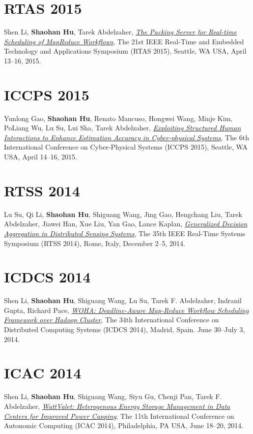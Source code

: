 \section{\sc RTAS 2015}\hypertarget{li2015rtas}{} Shen Li, \textbf{Shaohan Hu}, Tarek Abdelzaher, \href{http://ieeexplore.ieee.org/xpl/articleDetails.jsp?tp=&arnumber=7108416}{\emph{The Packing Server for Real-time Scheduling of MapReduce Workflows}}, \textsf{The 21st IEEE Real-Time and Embedded Technology and Applications Symposium (RTAS 2015)}, Seattle, WA USA, April 13--16, 2015.

\section{\sc ICCPS 2015}\hypertarget{gao2015iccps}{} Yunlong Gao, \textbf{Shaohan Hu}, Renato Mancuso, Hongwei Wang, Minje Kim, PoLiang Wu, Lu Su, Lui Sha, Tarek Abdelzaher, \href{http://dl.acm.org/citation.cfm?id=2735960.2735965}{\emph{Exploiting Structured Human Interactions to Enhance Estimation Accuracy in Cyber-physical Systems}}, \textsf{The 6th International Conference on Cyber-Physical Systems (ICCPS 2015)}, Seattle, WA USA, April 14--16, 2015.

\section{\sc RTSS 2014}\hypertarget{su2014rtss}{} Lu Su, Qi Li, \textbf{Shaohan Hu}, Shiguang Wang, Jing Gao, Hengchang Liu, Tarek Abdelzaher, Jiawei Han, Xue Liu, Yan Gao, Lance Kaplan, \href{http://ieeexplore.ieee.org/xpl/articleDetails.jsp?arnumber=7010369}{\emph{Generalized Decision Aggregation in Distributed Sensing Systems}}, \textsf{The 35th IEEE Real-Time Systems Symposium (RTSS 2014)}, Rome, Italy, December 2--5, 2014.

\section{\sc ICDCS 2014}\hypertarget{li2014icdcs}{} Shen Li, \textbf{Shaohan Hu}, Shiguang Wang, Lu Su, Tarek F. Abdelzaher, Indranil Gupta, Richard Pace, \href{http://ieeexplore.ieee.org/xpl/articleDetails.jsp?arnumber=6888886}{\emph{WOHA: Deadline-Aware Map-Reduce Workflow Scheduling Framework over Hadoop Cluster}}, \textsf{The 34th International Conference on Distributed Computing Systems (ICDCS 2014)}, Madrid, Spain. June 30--July 3, 2014.

\section{\sc ICAC 2014}\hypertarget{li2014icac}{} Shen Li, \textbf{Shaohan Hu}, Shiguang Wang, Siyu Gu, Chenji Pan, Tarek F. Abdelzaher, \href{https://www.usenix.org/system/files/conference/icac14/icac14-paper-li_shen.pdf}{\emph{WattValet: Heterogenous Energy Storage Management in Data Centers for Improved Power Capping}}, \textsf{The 11th International Conference on Autonomic Computing (ICAC 2014)}, Philadelphia, PA USA, June 18--20, 2014.

